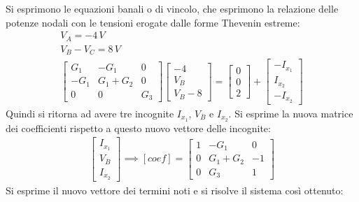 \documentclass{article}
\numberwithin{equation}{subsection}
\begin{document}
Si esprimono le equazioni banali o di vincolo, che esprimono la relazione delle potenze nodali con le tensioni erogate dalle forme Thevenin estreme: 
\begin{gather*}
    V_A=-4\,V\\
    V_B-V_C=8\,V\\
    \begin{bmatrix}
        G_1&-G_1&0\\-G_1&G_1+G_2&0\\0&0&G_3
    \end{bmatrix}\begin{bmatrix}
        -4\\V_B\\V_B-8
    \end{bmatrix}=\begin{bmatrix}
        0\\0\\2
    \end{bmatrix}+\begin{bmatrix}
        -I_{x_1}\\I_{x_2}\\-I_{x_2}
    \end{bmatrix}
\end{gather*}
Quindi si ritorna ad avere tre incognite $I_{x_1}$, $V_B$ e $I_{x_2}$. Si esprime la nuova matrice dei coefficienti rispetto a questo nuovo vettore delle incognite:
\begin{gather*}
    \begin{bmatrix}
        I_{x_1}\\V_B\\I_{x_2}
    \end{bmatrix}\implies\left[coef\right]=\begin{bmatrix}
        1&-G_1&0\\0&G_1+G_2&-1\\0&G_3&1
    \end{bmatrix}
\end{gather*}
Si esprime il nuovo vettore dei termini noti e si risolve il sistema così ottenuto:
\end{document}
